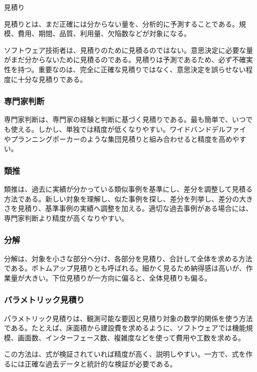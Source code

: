 \documentclass[a4paper,11pt]{ltjsarticle}
\numberwithin{figure}{section}
\numberwithin{table}{section}
\newcounter{definition}
\begin{document}
\begin{definitionbox}見積り\par\smallskip
見積りとは、まだ正確には分からない量を、分析的に予測することである。規模、費用、期間、品質、利用量、欠陥数などが対象になる。
\end{definitionbox}

ソフトウェア技術者は、見積りのために見積るのではない。意思決定に必要な量がまだ分からないために見積るのである。見積りは予測であるため、必ず不確実性を持つ。重要なのは、完全に正確な見積りではなく、意思決定を誤らせない程度に十分な見積りである。

\subsubsection{専門家判断}

専門家判断は、専門家の経験と判断に基づく見積りである。最も簡単で、いつでも使える。しかし、単独では精度が低くなりやすい。ワイドバンドデルファイやプランニングポーカーのような集団見積りと組み合わせると精度を高めやすい。

\subsubsection{類推}

類推は、過去に実績が分かっている類似事例を基準にし、差分を調整して見積る方法である。新しい対象を理解し、似た事例を探し、差分を列挙し、差分の大きさを見積り、基準事例の実績へ調整を加える。適切な過去事例がある場合には、専門家判断より精度が高くなりやすい。

\subsubsection{分解}

分解は、対象を小さな部分へ分け、各部分を見積り、合計して全体を求める方法である。ボトムアップ見積りとも呼ばれる。細かく見るため納得感は高いが、作業量が大きい。下位見積りが一方向に偏ると、全体見積りも偏る。

\subsubsection{パラメトリック見積り}

パラメトリック見積りは、観測可能な要因と見積り対象の数学的関係を使う方法である。たとえば、床面積から建設費を求めるように、ソフトウェアでは機能規模、画面数、インターフェース数、複雑度などを使って費用や工数を求める。

この方法は、式が検証されていれば精度が高く、説明しやすい。一方で、式を作るには正確な過去データと統計的な検証が必要である。
\end{document}
